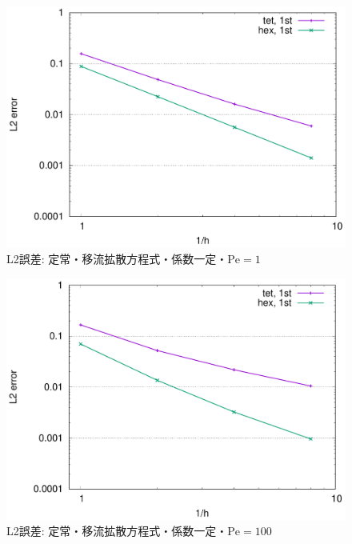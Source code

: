 \documentclass[8pt,a4paper]{article}
\begin{document}
\begin{figure}[h!!]
	\centering
	\includegraphics[width=10.0truecm]{pics/conv_convdiff_const_pe1.pdf}
	\caption{L2誤差: 定常・移流拡散方程式・係数一定・$\mathrm{Pe} = 1$}
	\label{fig:conv_convdiff_const_pe1}
\end{figure}
\begin{figure}[h!!]
	\centering
	\includegraphics[width=10.0truecm]{pics/conv_convdiff_const_pe100.pdf}
	\caption{L2誤差: 定常・移流拡散方程式・係数一定・$\mathrm{Pe} = 100$}
	\label{fig:conv_convdiff_const_pe100}
\end{figure}
\end{document}
